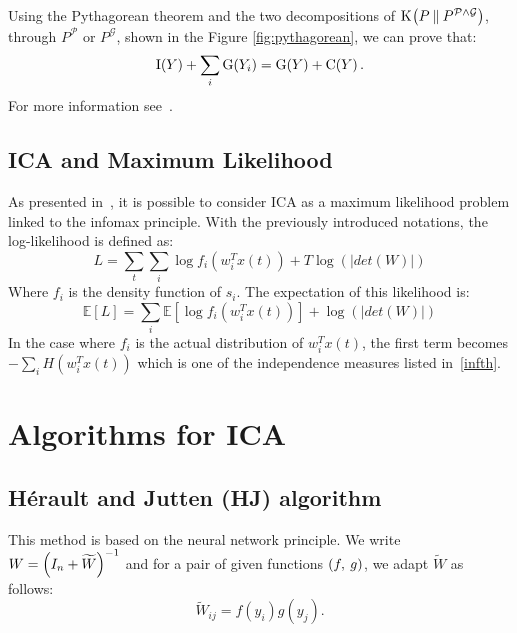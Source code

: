 \documentclass[a4paper]{article}
\newcommand{\Kl}[3][]{\mathrm K_{#1}\!\zp{#2\:\|\:#3}}
\newcommand{\zZ}[2]{\mathrm #1\!\zp{#2}}
\newcommand{\zD}{\mathcal}
\begin{document}
Using the Pythagorean theorem and the two decompositions of $\Kl P{P^{\zD P\wedge\zD G}}$, through $P^{\zD P}$ or $P^{\zD G}$, shown in the Figure \ref{fig:pythagorean}, we can prove that:
\begin{equation}
        \zZ IY + \sum_i\zZ G{Y_i} = \zZ GY + \zZ CY.
\end{equation}
For more information see~\cite{cardoso2003}.

\subsection{ICA and Maximum Likelihood}
As presented in~\cite{hyvarinen2000}, it is possible to consider ICA as a maximum likelihood problem linked to the infomax principle. 
With the previously introduced notations, the log-likelihood is defined as:
\begin{equation}
L = \sum_t \sum_i \log f_i(w_i^Tx(t))+T\log(|det(W)|)
\end{equation}
Where $f_i$ is the density function of $s_i$. The expectation of this likelihood is:
\begin{equation}
\mathbb{E}[L] = \sum_i \mathbb{E}[\log f_i(w_i^Tx(t))]+\log(|det(W)|)
\end{equation}
In the case where $f_i$ is the actual distribution of $w_i^Tx(t)$, the first term becomes $-\sum_i H(w_i^Tx(t))$ which is one of the independence measures listed in~\ref{infth}.


\section{Algorithms for ICA}
\subsection{Hérault and Jutten (HJ) algorithm}
This method is based on the neural network principle.
We write $W = \zp{I_n+\widetilde W}^{-1}$ and for a pair of given functions $\zp{f,\:g}$, we adapt $\widetilde W$ as follows:\begin{equation}
\widetilde W_{ij} = f(y_i) g(y_j).
\end{equation}

\end{document}
